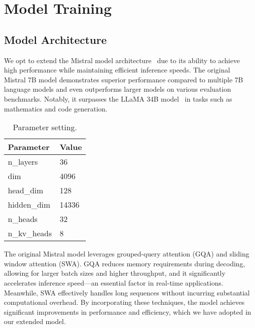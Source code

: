 \section{Model Training}\label{sec3.model_training}




\subsection{Model Architecture}\label{sec3.1}

We opt to extend the Mistral model architecture~\cite{jiang2023mistral7b} due to its ability to achieve high performance while maintaining efficient inference speeds. The original Mistral 7B model demonstrates superior performance compared to multiple 7B language models and even outperforms larger models on various evaluation benchmarks. Notably, it surpasses the LLaMA 34B model~\cite{roziere2023code} in tasks such as mathematics and code generation.

 

\begin{wraptable}{r}{4cm}
\vspace{-12pt}\caption{Parameter setting.}\label{wrap-tab:1}
\begin{tabular}{l|l}
\hline
Parameter    & Value \\ \hline
n\_layers    & 36    \\
dim          & 4096  \\
head\_dim    & 128   \\
hidden\_dim  & 14336 \\
n\_heads     & 32    \\
n\_kv\_heads & 8     \\
 \hline
\end{tabular}
\end{wraptable} 
The original Mistral model leverages grouped-query attention (GQA)\cite{ainslie2023gqa} and sliding window attention (SWA)\cite{beltagy2020longformer}. GQA reduces memory requirements during decoding, allowing for larger batch sizes and higher throughput, and it significantly accelerates inference speed—an essential factor in real-time applications. Meanwhile, SWA effectively handles long sequences without incurring substantial computational overhead. By incorporating these techniques, the model achieves significant improvements in performance and efficiency, which we have adopted in our extended model.



